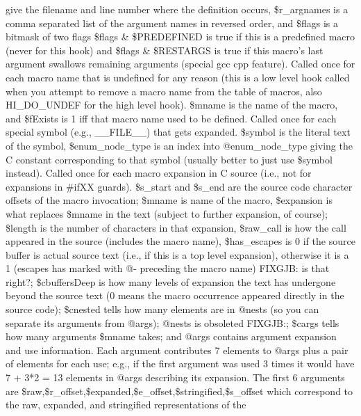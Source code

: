 give the filename and line number where the definition occurs, 
\$r\_\-argnames is a comma separated list of the
argument names in reversed order, and \$flags is a bitmask of two flags
\$flags \& \$PREDEFINED is true if this is a predefined macro (never for this hook)
and \$flags \& \$RESTARGS is true if this macro's last argument swallows 
remaining arguments (special gcc cpp feature).
Called once for each macro name that is undefined for any reason (this is
a low level hook called when you attempt to remove a macro name from the 
table of macros,
also HI\_\-DO\_\-UNDEF for the high level hook).  \$mname is the name of the
macro, and \$fExists is 1 iff that macro name used to be defined.
Called once for each special symbol (e.g., \_\-\_\-FILE\_\-\_\-) that gets expanded.
\$symbol is the literal text of the symbol, \$enum\_\-node\_\-type is an index
into @enum\_\-node\_\-type giving the C constant corresponding to that symbol
(usually better to just use \$symbol instead).
Called once for each macro expansion in C source (i.e., not for expansions
in \#ifXX guards). \$s\_\-start and \$s\_\-end are the source code character offsets
of the macro invocation; \$mname is name of the macro, \$expansion is what
replaces \$mname in the text (subject to further expansion, of course); \$length
is the number of characters in that expansion, \$raw\_\-call is how the call
appeared in the source (includes the macro name), \$has\_\-escapes is 0 if the
source buffer is actual source text (i.e., if this is a top level expansion),
otherwise it is a 1 (escapes has marked with @- preceding the macro name)
FIXGJB: is that right?; \$cbuffersDeep is how many levels of expansion the text
has undergone beyond the source text (0 means the macro occurrence appeared
directly in the source code); \$cnested tells how many elements are in @nests
(so you can separate its arguments from @args); @nests is obsoleted FIXGJB:;
\$cargs tells how many arguments \$mname takes; and @args contains argument
expansion and use information.  Each argument contributes 7 elements to @args
plus a pair of elements for each use;  e.g., if the first argument was used 3 times
it would have 7 + 3*2 = 13 elements in @args describing its expansion.  The
first 6 arguments are \$raw,\$r\_\-offset,\$expanded,\$e\_\-offset,\$stringified,\$s\_\-offset
which correspond to the raw, expanded, and stringified representations of the
